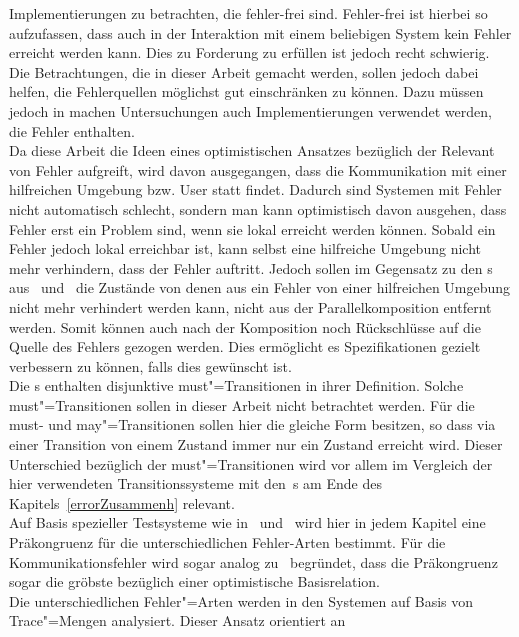 Implementierungen zu betrachten, die fehler-frei sind. Fehler-frei ist hierbei
so aufzufassen, dass auch in der Interaktion mit einem beliebigen System kein
Fehler erreicht werden kann. Dies zu Forderung zu erfüllen ist jedoch recht
schwierig. Die Betrachtungen, die in dieser Arbeit gemacht werden, sollen
jedoch dabei helfen, die Fehlerquellen möglichst gut einschränken zu können.
Dazu müssen jedoch in machen Untersuchungen auch Implementierungen verwendet
werden, die Fehler enthalten.\\
Da diese Arbeit die Ideen eines optimistischen Ansatzes bezüglich der Relevant
von Fehler aufgreift, wird davon ausgegangen, dass die Kommunikation
mit einer hilfreichen Umgebung bzw. User statt findet. Dadurch sind Systemen
mit Fehler nicht automatisch schlecht, sondern man kann optimistisch davon
ausgehen, dass Fehler erst ein Problem sind, wenn sie lokal erreicht werden
können. Sobald ein Fehler jedoch lokal erreichbar ist, kann selbst eine
hilfreiche Umgebung nicht mehr verhindern, dass der Fehler auftritt. Jedoch
sollen im Gegensatz zu den \MIA{}s aus~\cite{Luttgen2013MIA1}
und~\cite{Vogler2016MIA3} die Zustände von denen aus ein Fehler von einer
hilfreichen Umgebung nicht mehr verhindert werden kann, nicht aus der
Parallelkomposition entfernt werden. Somit können auch nach der Komposition
noch Rückschlüsse auf die Quelle des Fehlers gezogen werden. Dies ermöglicht es
Spezifikationen gezielt verbessern zu können, falls dies gewünscht ist.\\
Die \MIA{}s enthalten disjunktive must"=Transitionen in ihrer Definition.
Solche must"=Transitionen sollen in dieser Arbeit nicht betrachtet werden. Für
die must- und may"=Transitionen sollen hier die gleiche Form besitzen, so dass
via einer Transition von einem Zustand immer nur ein Zustand erreicht wird.
Dieser Unterschied bezüglich der must"=Transitionen wird vor allem im Vergleich
der hier verwendeten Transitionssysteme mit den~\MIA{}s am Ende des
Kapitels~\ref{errorZusammenh} relevant.\\
Auf Basis spezieller Testsysteme wie in~\cite{Vogler2015FailSem}
und~\cite{Vogler2017dMTS} wird hier in jedem Kapitel eine Präkongruenz für die
unterschiedlichen Fehler-Arten bestimmt. Für die Kommunikationsfehler wird
sogar analog zu~\cite{Schinko2016BA} begründet, dass die Präkongruenz sogar die
gröbste bezüglich einer optimistische Basisrelation.\\
Die unterschiedlichen Fehler"=Arten werden in den Systemen auf Basis von
Trace"=Mengen analysiert. Dieser Ansatz orientiert an~\cite{Vogler2014EIO}
